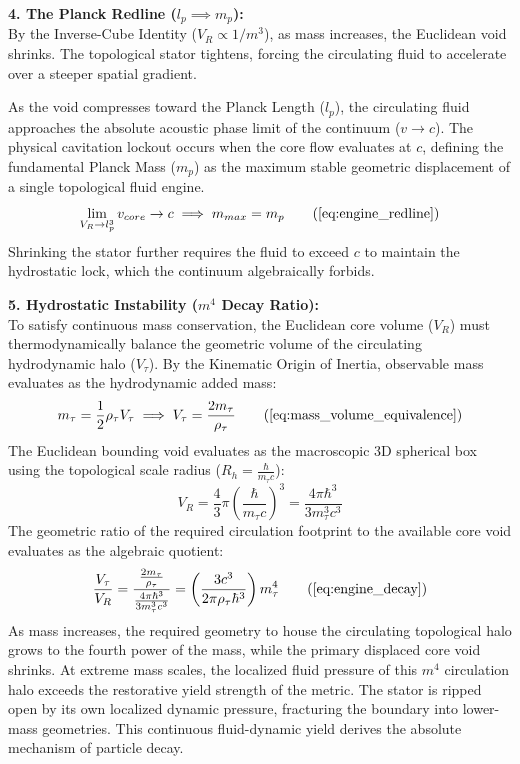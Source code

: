 \documentclass[11pt, a4paper]{article}
\begin{document}
\textbf{4. The Planck Redline ($l_p \implies m_p$):} \\
By the Inverse-Cube Identity ($V_R \propto 1/m^3$), as mass increases, the Euclidean void shrinks. The topological stator tightens, forcing the circulating fluid to accelerate over a steeper spatial gradient. 

As the void compresses toward the Planck Length ($l_p$), the circulating fluid approaches the absolute acoustic phase limit of the continuum ($v \to c$). The physical cavitation lockout occurs when the core flow evaluates at $c$, defining the fundamental Planck Mass ($m_p$) as the maximum stable geometric displacement of a single topological fluid engine. 
\begin{equation}
    \lim_{V_R \to l_p^3} v_{core} \to c \implies m_{max} = m_p \tag{\ref{eq:engine_redline}}
\end{equation}
Shrinking the stator further requires the fluid to exceed $c$ to maintain the hydrostatic lock, which the continuum algebraically forbids.

\textbf{5. Hydrostatic Instability ($m^4$ Decay Ratio):} \\
To satisfy continuous mass conservation, the Euclidean core volume ($V_R$) must thermodynamically balance the geometric volume of the circulating hydrodynamic halo ($V_\tau$). 
By the Kinematic Origin of Inertia, observable mass evaluates as the hydrodynamic added mass:
\begin{equation}
    m_\tau = \frac{1}{2} \rho_{\tau} V_\tau \implies V_\tau = \frac{2m_\tau}{\rho_{\tau}} \tag{\ref{eq:mass_volume_equivalence}}
\end{equation}
The Euclidean bounding void evaluates as the macroscopic 3D spherical box using the topological scale radius ($R_h = \frac{\hbar}{m_\tau c}$):
\begin{equation}
    V_R = \frac{4}{3}\pi \left(\frac{\hbar}{m_\tau c}\right)^3 = \frac{4\pi\hbar^3}{3m_\tau^3 c^3} 
\end{equation}
The geometric ratio of the required circulation footprint to the available core void evaluates as the algebraic quotient:
\begin{equation}
    \frac{V_\tau}{V_R} = \frac{\frac{2m_\tau}{\rho_{\tau}}}{\frac{4\pi\hbar^3}{3m_\tau^3 c^3}} = \left(\frac{3c^3}{2\pi\rho_{\tau}\hbar^3}\right) m_\tau^4 \tag{\ref{eq:engine_decay}}
\end{equation}
As mass increases, the required geometry to house the circulating topological halo grows to the fourth power of the mass, while the primary displaced core void shrinks. At extreme mass scales, the localized fluid pressure of this $m^4$ circulation halo exceeds the restorative yield strength of the metric. The stator is ripped open by its own localized dynamic pressure, fracturing the boundary into lower-mass geometries. This continuous fluid-dynamic yield derives the absolute mechanism of particle decay.
\end{document}
